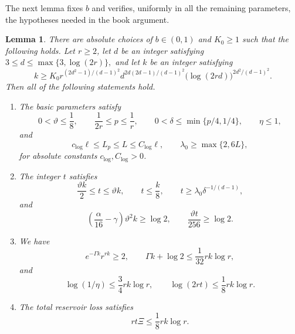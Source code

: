 \documentclass[twoside,12pt]{article}
\newtheorem{lemma}[theorem]{Lemma}
\theoremstyle{definition}
\theoremstyle{remark}
\newcommand{\1}{\mathbf 1}
\begin{document}
The next lemma fixes $b$ and verifies, uniformly in all the remaining
parameters, the hypotheses needed in the book argument.

\begin{lemma}\label{lem:uniform-parameters}
There are absolute choices of $b\in(0,1)$ and $K_0\ge1$ such that the
following holds. Let $r\ge2$, let $d$ be an integer satisfying
$
 3\le d\le\max\{3,\log(2r)\},
$
and let $k$ be an integer satisfying
\[
 k\ge
 K_0 r^{(2d^2-1)/(d-1)^2}
 d^{2d(2d-1)/(d-1)^2}
 \bigl(\log(2rd)\bigr)^{2d^2/(d-1)^2}.
\]
Then all of the following statements hold.
\begin{enumerate}[label=\textup{(\roman*)}]
\item The basic parameters satisfy
\begin{equation}\label{eq:uniform-basic}
 0<\vartheta\le\frac18,
 \qquad
 \frac1{2r}\le p\le\frac1r,
 \qquad
 0<\delta\le\min\{p/4,1/4\},
 \qquad
 \eta\le1,
\end{equation}
and
\begin{equation}\label{eq:uniform-logs}
 c_{\log}\ell\le L_p\le L\le C_{\log}\ell,
 \qquad
 \lambda_0\ge\max\{2,6L\},
\end{equation}
for absolute constants $c_{\log},C_{\log}>0$.

\item The integer $t$ satisfies
\begin{equation}\label{eq:uniform-book}
 \frac{\vartheta k}{2}\le t\le\vartheta k,
 \qquad
 t\le\frac k8,
 \qquad
 t\ge\lambda_0\delta^{-1/(d-1)},
\end{equation}
and
\begin{equation}\label{eq:uniform-margins}
 \left(\frac{\alpha}{16}-\gamma\right)\vartheta^2k\ge\log2,
 \qquad
 \frac{\vartheta t}{256}\ge\log2.
\end{equation}

\item We have
\begin{equation}\label{eq:uniform-size}
 e^{-\Gamma k}r^{rk}\ge2,
 \qquad
 \Gamma k+\log2\le\frac1{32}rk\log r,
\end{equation}
and
\begin{equation}\label{eq:uniform-auxiliary}
 \log(1/\eta)\le\frac34rk\log r,
 \qquad
 \log(2rt)\le\frac18rk\log r.
\end{equation}

\item The total reservoir loss satisfies
\begin{equation}\label{eq:uniform-reservoir-exponent}
 rt\Xi\le\frac18rk\log r.
\end{equation}
\end{enumerate}
\end{lemma}
\end{document}
